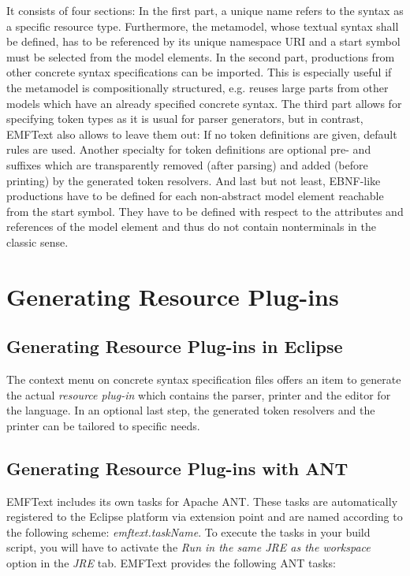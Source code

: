 It consists of four sections: In the first part, a unique
name refers to the syntax as a specific resource type. Furthermore, the metamodel, 
whose textual syntax shall be defined, has 
to be referenced by its  unique namespace URI and a start symbol must be selected from 
the model elements. In the second part, productions from other concrete syntax 
specifications can be imported. This is especially useful if the metamodel is 
compositionally structured, e.g. reuses large parts from other models which have an 
already specified concrete syntax.  The third part allows for specifying token types as
 it is usual for parser generators, but in contrast, EMFText also allows to leave them 
 out: If no token definitions are given, default rules are used. Another specialty for 
 token definitions are optional pre- and suffixes which are transparently removed (after 
 parsing) and added (before printing) by the generated token resolvers. And last but 
 not least, EBNF-like productions have to be defined for each non-abstract model element 
 reachable from the start symbol. They have to be defined with respect to the attributes 
 and references of the model element and thus do not contain nonterminals in the classic 
 sense.

\section{Generating Resource Plug-ins}
\label{sec:process_generating}

\subsection{Generating Resource Plug-ins in Eclipse}

The context menu on concrete syntax specification files offers an item to generate the 
actual \emph{resource plug-in} which contains the parser, printer and the editor
for the language. In an optional last step, the generated token resolvers and the printer 
can be tailored to specific needs.

\subsection{Generating Resource Plug-ins with ANT}
EMFText includes its own tasks for Apache ANT. These tasks are automatically registered 
to the Eclipse platform via extension point and are named according to the following 
scheme: \emph{emftext.taskName}. To execute the tasks in your build script, you will
have to activate the \emph{Run in the same JRE as the workspace} option in the \emph{JRE}
tab. EMFText provides the following ANT tasks:
